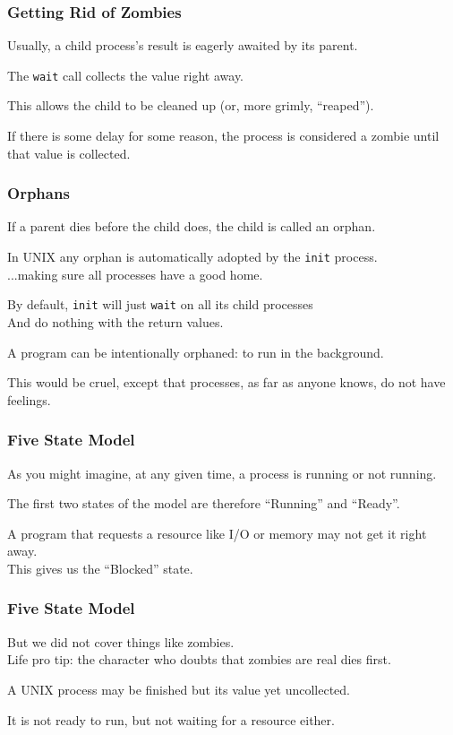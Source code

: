 \begin{frame}
	\frametitle{Getting Rid of Zombies}

	Usually, a child process's result is eagerly awaited by its parent.

	The \texttt{wait} call collects the value right away.

	This allows the child to be cleaned up (or, more grimly, ``reaped'').

	If there is some delay for some reason, the process is considered a zombie until that value is collected.

\end{frame}


\begin{frame}
	\frametitle{Orphans}

	If a parent dies before the child does, the child is called an \alert{orphan}.

	In UNIX any orphan is automatically adopted by the \texttt{init} process.\\
	\quad ...making sure all processes have a good home.

	By default, \texttt{init} will just \texttt{wait} on all its child processes\\
	\quad And do nothing with the return values.

	A program can be intentionally orphaned: to run in the background.


	This would be cruel, except that processes, as far as anyone knows, do not have feelings.


\end{frame}


\begin{frame}
	\frametitle{Five State Model}

	As you might imagine, at any given time, a process is running or not running.

	The first two states of the model are therefore ``Running'' and ``Ready''.

	A program that requests a resource like I/O or memory may not get it right away.\\
	\quad This gives us the ``Blocked'' state.

\end{frame}


\begin{frame}
	\frametitle{Five State Model}

	But we did not cover things like zombies.\\
	\quad Life pro tip: the character who doubts that zombies are real dies first.

	A UNIX process may be finished but its value yet uncollected.

	It is not ready to run, but not waiting for a resource either.

\end{frame}


